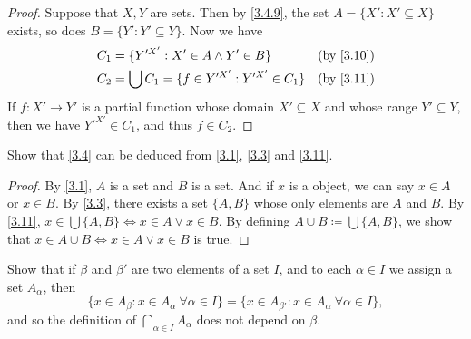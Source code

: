\begin{proof}
  Suppose that \(X, Y\) are sets.
  Then by \cref{3.4.9}, the set \(A = \{X' : X' \subseteq X\}\) exists, so does \(B = \{Y' : Y' \subseteq Y\}\).
  Now we have
  \begin{align*}
    C_1 & = \{Y'^{X'} : X' \in A \land Y' \in B\}             & \text{(by \cref{3.10})} \\
    C_2 & = \bigcup C_1 = \{f \in Y'^{X'} : Y'^{X'} \in C_1\} & \text{(by \cref{3.11})} \\
  \end{align*}
  If \(f : X' \to Y'\) is a partial function whose domain \(X' \subseteq X\) and whose range \(Y' \subseteq Y\), then we have \(Y'^{X'} \in C_1\), and thus \(f \in C_2\).
\end{proof}

\begin{ex}\label{ex:3.4.8}
  Show that \cref{3.4} can be deduced from \cref{3.1}, \cref{3.3} and \cref{3.11}.
\end{ex}

\begin{proof}
  By \cref{3.1}, \(A\) is a set and \(B\) is a set.
  And if \(x\) is a object, we can say \(x \in A\) or \(x \in B\).
  By \cref{3.3}, there exists a set \(\{A, B\}\) whose only elements are \(A\) and \(B\).
  By \cref{3.11}, \(x \in \bigcup \{A, B\} \iff x \in A \lor x \in B\).
  By defining \(A \cup B \coloneqq \bigcup \{A, B\}\), we show that \(x \in A \cup B \iff x \in A \lor x \in B\) is true.
\end{proof}

\begin{ex}\label{ex:3.4.9}
  Show that if \(\beta\) and \(\beta'\) are two elements of a set \(I\), and to each \(\alpha \in I\) we assign a set \(A_{\alpha}\), then
  \[
    \{x \in A_{\beta} : x \in A_{\alpha} \ \forall \alpha \in I\} = \{x \in A_{\beta'} : x \in A_{\alpha} \ \forall \alpha \in I\},
  \]
  and so the definition of \(\bigcap_{\alpha \in I} A_{\alpha}\) does not depend on \(\beta\).
\end{ex}

